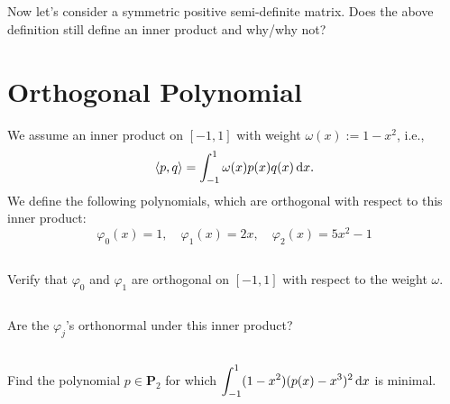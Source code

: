 \documentclass[11pt,letterpaper]{report}
\begin{document}
\subsection{}
Now let's consider a symmetric positive
  semi-definite matrix. Does the above definition still define an
  inner product and why/why not?
  
\section{Orthogonal Polynomial}
We assume
  an inner product on $[-1,1]$ with weight $\omega(x):=1-x^2$, i.e.,
  $$
  \langle p,q\rangle = \int_{-1}^1 \omega(x)p(x)q(x)\,\mathrm{d} x.
  $$ We define the following polynomials, which are orthogonal with
  respect to this inner product:
  $$
  \varphi_0(x) = 1, \quad \varphi_1(x) = 2x, \quad \varphi_2(x) = 5x^2-1
  $$

\subsection{}
Verify that $\varphi_0$ and $\varphi_1$ are orthogonal on $[-1,1]$
    with respect to the weight $\omega$.

\subsection{}
Are the $\varphi_j$'s orthonormal under this inner product?

\subsection{}
Find the polynomial $p \in \boldsymbol P_2$ for which
    $\displaystyle \int_{-1}^1 (1-x^2)(p(x) - x^3)^2 \, \mathrm{d} x$ is minimal.


\newpage


\end{document}
